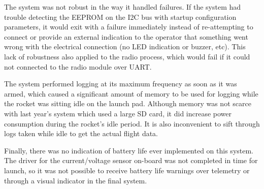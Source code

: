 The system was not robust in the way it handled failures. If the system had trouble detecting the EEPROM on the
I2C bus with startup configuration parameters, it would exit with a failure immediately instead of re-attempting to
connect or provide an external indication to the operator that something went wrong with the electrical connection (no
LED indication or buzzer, etc). This lack of robustness also applied to the radio process, which would fail if it could
not connected to the radio module over UART.

The system performed logging at its maximum frequency as soon as it was armed, which caused a significant amount of
memory to be used for logging while the rocket was sitting idle on the launch pad. Although memory was not scarce with
last year's system which used a large SD card, it did increase power consumption during the rocket's idle period. It is
also inconvenient to sift through logs taken while idle to get the actual flight data.

Finally, there was no indication of battery life ever implemented on this system. The driver for the current/voltage
sensor on-board was not completed in time for launch, so it was not possible to receive battery life warnings over
telemetry or through a visual indicator in the final system.
